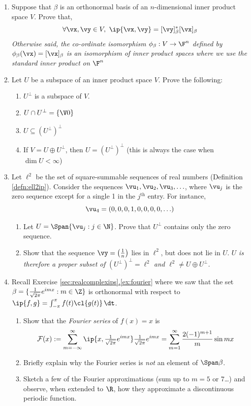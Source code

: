 \begin{exercises}{}{}
\begin{enumerate}
  \item Suppose that $\beta$ is an orthonormal basis of an $n$-dimensional inner product space $V$. Prove that,
	\[\forall\vx,\vy\in V,\ \ip{\vx,\vy}=[\vy]_\beta^*[\vx]_\beta\]
	\emph{Otherwise said, the co-ordinate isomorphism $\phi_\beta:V\to \F^n$ defined by $\phi_\beta(\vx)=[\vx]_\beta$ is an isomorphism of inner product spaces where we use the standard inner product on $\F^n$}
 	
  \item\label{ex:uperpperp} Let $U$ be a subspace of an inner product space $V$. Prove the following:
  \begin{enumerate}
    \item $U^\perp$ is a subspace of $V$.
    \item $U\cap U^\perp=\{\V0\}$
    \item $U\subseteq (U^\perp)^\perp$
    \item If $V=U\oplus U^\perp$, then $U=(U^\perp)^\perp$ (this is always the case when $\dim U<\infty$)
  \end{enumerate}
  
  
  
  \item\label{ex:ell2ex} Let $\ell^2$ be the set of square-summable sequences of real numbers (Definition \ref{defn:ell2ip}). Consider the sequences $\vu_1,\vu_2,\vu_3,\ldots$, where $\vu_j$ is the zero sequence except for a single 1 in the $j^\text{th}$ entry. For instance,
 	\[\vu_4=(0,0,0,1,0,0,0,0,\ldots)\]
  \begin{enumerate}
    \item Let $U=\Span\{\vu_j:j\in\N\}$. Prove that $U^\perp$ contains only the zero sequence.
    \item Show that the sequence $\vy=\left(\frac 1n\right)$ lies in $\ell^2$, but does not lie in $U$.\smallbreak
    \emph{$U$ is therefore a \emph{proper subset} of $(U^\perp)^\perp=\ell^2$ and $\ell^2\neq U\oplus U^\perp$.}
  \end{enumerate}
 
  \item\label{ex:fourierx} Recall Exercise \hyperref[ex:fourier]{\ref*{sec:realcomplexips}.\ref*{ex:fourier}} where we saw that the set $\beta=\{\frac 1{\sqrt{2\pi}}e^{i mx}:m\in\Z\}$ is orthonormal with respect to $\ip{f,g}=\int_{-\pi}^\pi f(t)\cl{g(t)}\,\dt$.
  \begin{enumerate}
    \item Show that the \emph{Fourier series} of $f(x)=x$ is
  	\[\mathcal{F}(x):=\sum_{m=-\infty}^\infty \ip{x,\tfrac 1{\sqrt{2\pi}}e^{i mx}}\tfrac 1{\sqrt{2\pi}}e^{i mx} %
  	=\sum_{m=1}^\infty\frac{2(-1)^{m+1}}m\sin mx\]
  	\item Briefly explain why the Fourier series is \emph{not} an element of $\Span\beta$.
  	\item Sketch a few of the Fourier approximations (sum up to $m=5$ or 7\ldots) and observe, when extended to $\R$, how they approximate a discontinuous periodic function.
 	\end{enumerate}


\end{enumerate}
\end{exercises}

